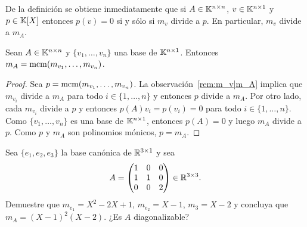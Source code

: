 \begin{remark}
    \label{rem:m_v|m_A}
	De la definición se obtiene inmediatamente que si $A\in\mathbb{K}^{n\times n}$,
	$v\in\mathbb{K}^{n\times1}$ y $p\in\mathbb{K}[X]$ entonces $p(v)=0$ si y sólo si $m_v$
	divide a $p$.  En particular, $m_v$ divide a $m_A$.
\end{remark}

%

\begin{prop}
	\label{pro:mA=mcm}
	Sean $A\in\mathbb{K}^{n\times n}$ y $\{v_1,\dots,v_n\}$ una base de
	$\mathbb{K}^{n\times1}$.  Entonces $m_A=\mathrm{mcm}(m_{v_1},\dots,m_{v_n})$. 
	
	\begin{proof}
		Sea $p=\mathrm{mcm}(m_{v_1},\dots,m_{v_n})$. La observación~\ref{rem:m_v|m_A}
		implica que $m_{v_i}$ divide a $m_A$ para todo $i\in\{1,\dots,n\}$ y
		entonces $p$ divide a $m_A$.  Por otro lado, cada $m_{v_i}$ divide a
		$p$ y entonces $p(A)v_i=p(v_i)=0$ para todo $i\in\{1,\dots,n\}$. Como
		$\{v_1,\dots,v_n\}$ es una base de $\mathbb{K}^{n\times1}$, entonces $p(A)=0$ y
		luego $m_A$ divide a $p$.  Como $p$ y $m_A$ son polinomios mónicos,
		$p=m_A$. 
	\end{proof}
\end{prop}


\begin{xca}
	Sea $\{e_1,e_2,e_3\}$ la base canónica de $\mathbb{R}^{3\times1}$ y sea
	\[
		A=\begin{pmatrix}
			1 & 0 & 0\\
			1 & 1 & 0\\
			0 & 0 & 2
		\end{pmatrix}\in\mathbb{R}^{3\times3}.
	\]
	Demuestre que $m_{e_1}=X^2-2X+1$, $m_{e_2}=X-1$, $m_3=X-2$ y concluya que
	$m_A=(X-1)^2(X-2)$. ¿Es $A$ diagonalizable?
\end{xca}

